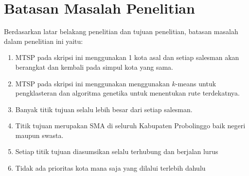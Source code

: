\section{Batasan Masalah Penelitian}

Berdasarkan latar belakang penelitian dan tujuan penelitian, batasan masalah dalam penelitian ini yaitu:

\begin{enumerate}
	\item MTSP pada skripsi ini menggunakan 1 kota asal dan setiap salesman akan berangkat dan kembali pada simpul kota yang sama.
	\item MTSP pada skripsi ini menggunakan menggunakan $k$-means untuk pengklasteran dan algoritma genetika untuk menentukan rute terdekatnya.
	\item Banyak titik tujuan selalu lebih besar dari setiap salesman.
	\item Titik tujuan merupakan SMA di seluruh Kabupaten Probolinggo baik negeri maupun swasta.
	\item Setiap titik tujuan diasumsikan selalu terhubung dan berjalan lurus
	\item Tidak ada prioritas kota mana saja yang dilalui terlebih dahulu
\end{enumerate}
